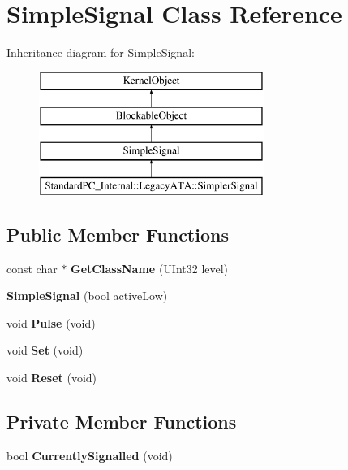 \hypertarget{class_simple_signal}{}\section{Simple\+Signal Class Reference}
\label{class_simple_signal}
Inheritance diagram for Simple\+Signal\+:\begin{figure}[H]
\begin{center}
\leavevmode
\includegraphics[height=4.000000cm]{class_simple_signal}
\end{center}
\end{figure}
\subsection*{Public Member Functions}
\begin{DoxyCompactItemize}
\item 
\mbox{\label{class_simple_signal_a4f4c97139fcd4224b446163208775ae8}} 
const char $\ast$ {\bfseries Get\+Class\+Name} (U\+Int32 level)
\item 
\mbox{\label{class_simple_signal_a04a83ec5dd5a82bf741cf6e253cf5bf9}} 
{\bfseries Simple\+Signal} (bool active\+Low)
\item 
\mbox{\label{class_simple_signal_a7a064f507359ddf401e95d9891ffc213}} 
void {\bfseries Pulse} (void)
\item 
\mbox{\label{class_simple_signal_a4fbf93fe402fa69ee50e770547661b06}} 
void {\bfseries Set} (void)
\item 
\mbox{\label{class_simple_signal_af60f0eefdc7accfc5687ab9dfb31a823}} 
void {\bfseries Reset} (void)
\end{DoxyCompactItemize}
\subsection*{Private Member Functions}
\begin{DoxyCompactItemize}
\item 
\mbox{\label{class_simple_signal_a392a4f7c7ebab9cc4ca42d1ebc6091fe}} 
bool {\bfseries Currently\+Signalled} (void)
\end{DoxyCompactItemize}
